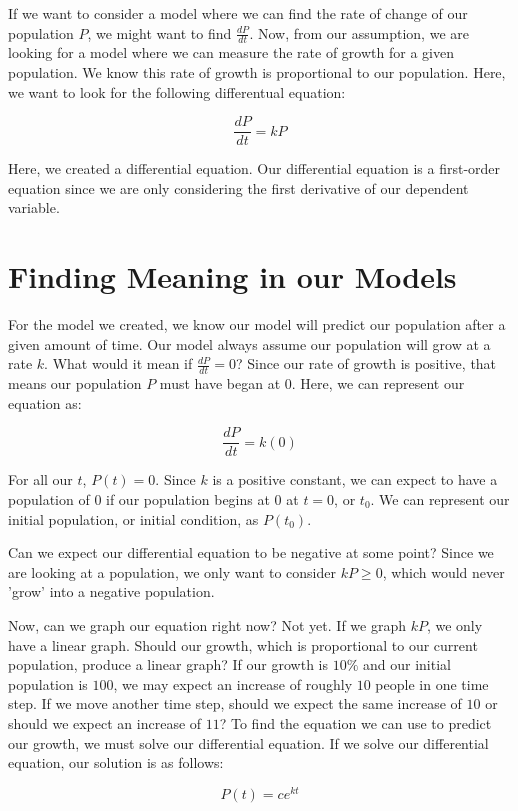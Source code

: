 \documentclass{amsart}
\theoremstyle{definition}
\numberwithin{equation}{section}
\begin{document}
\begin{sansmath}
If we want to consider a model where we can find the rate of change of our population $P$, we might want to find $\frac{dP}{dt}$. Now, from our assumption, we are looking for a model where we can measure the rate of growth for a given population. We know this rate of growth is proportional to our population. Here, we want to look for the following differentual equation:

\[ \frac{dP}{dt} = kP \]

Here, we created a differential equation. Our differential equation is a first-order equation since we are only considering the first derivative of our dependent variable.

\section{Finding Meaning in our Models}

For the model we created, we know our model will predict our population after a given amount of time. Our model always assume our population will grow at a rate $k$. What would it mean if $\frac{dP}{dt} = 0$? Since our rate of growth is positive, that means our population $P$ must have began at $0$. Here, we can represent our equation as:

\[ \frac{dP}{dt} = k(0)\]

For all our $t$, $P(t) = 0$. Since $k$ is a positive constant, we can expect to have a population of $0$ if our population begins at $0$ at $t = 0$, or $t_0$. We can represent our initial population, or initial condition, as $P(t_0)$.

Can we expect our differential equation to be negative at some point? Since we are looking at a population, we only want to consider $kP \geq 0$, which would never 'grow' into a negative population.

Now, can we graph our equation right now? Not yet. If we graph $kP$, we only have a linear graph. Should our growth, which is proportional to our current population, produce a linear graph? If our growth is $10\%$ and our initial population is $100$, we may expect an increase of roughly $10$ people in one time step. If we move another time step, should we expect the same increase of $10$ or should we expect an increase of $11$? To find the equation we can use to predict our growth, we must solve our differential equation. If we solve our differential equation, our solution is as follows:

\[ P(t) = ce^{kt} \]



\end{sansmath}
\end{document}
